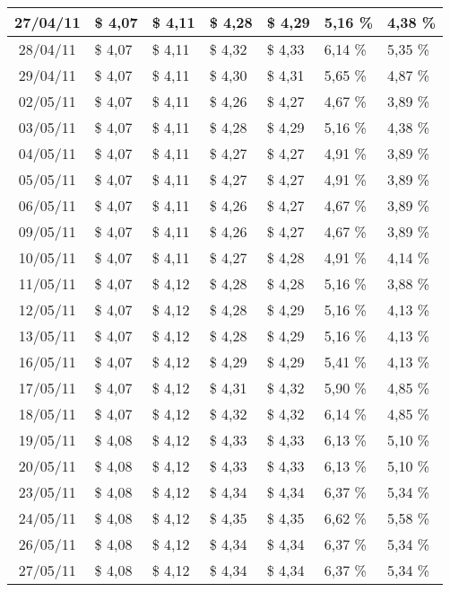 \begin{center}
\begin{longtable}{|c|p{1.5cm}|p{1.5cm}|p{1.5cm}|p{1.5cm}|p{1.5cm}|p{1.5cm}|}
27/04/11 & \$ 4,07 & \$ 4,11 & \$ 4,28 & \$ 4,29 & 5,16 \% & 4,38 \% \\ \hline
28/04/11 & \$ 4,07 & \$ 4,11 & \$ 4,32 & \$ 4,33 & 6,14 \% & 5,35 \% \\ \hline
29/04/11 & \$ 4,07 & \$ 4,11 & \$ 4,30 & \$ 4,31 & 5,65 \% & 4,87 \% \\ \hline
02/05/11 & \$ 4,07 & \$ 4,11 & \$ 4,26 & \$ 4,27 & 4,67 \% & 3,89 \% \\ \hline
03/05/11 & \$ 4,07 & \$ 4,11 & \$ 4,28 & \$ 4,29 & 5,16 \% & 4,38 \% \\ \hline
04/05/11 & \$ 4,07 & \$ 4,11 & \$ 4,27 & \$ 4,27 & 4,91 \% & 3,89 \% \\ \hline
05/05/11 & \$ 4,07 & \$ 4,11 & \$ 4,27 & \$ 4,27 & 4,91 \% & 3,89 \% \\ \hline
06/05/11 & \$ 4,07 & \$ 4,11 & \$ 4,26 & \$ 4,27 & 4,67 \% & 3,89 \% \\ \hline
09/05/11 & \$ 4,07 & \$ 4,11 & \$ 4,26 & \$ 4,27 & 4,67 \% & 3,89 \% \\ \hline
10/05/11 & \$ 4,07 & \$ 4,11 & \$ 4,27 & \$ 4,28 & 4,91 \% & 4,14 \% \\ \hline
11/05/11 & \$ 4,07 & \$ 4,12 & \$ 4,28 & \$ 4,28 & 5,16 \% & 3,88 \% \\ \hline
12/05/11 & \$ 4,07 & \$ 4,12 & \$ 4,28 & \$ 4,29 & 5,16 \% & 4,13 \% \\ \hline
13/05/11 & \$ 4,07 & \$ 4,12 & \$ 4,28 & \$ 4,29 & 5,16 \% & 4,13 \% \\ \hline
16/05/11 & \$ 4,07 & \$ 4,12 & \$ 4,29 & \$ 4,29 & 5,41 \% & 4,13 \% \\ \hline
17/05/11 & \$ 4,07 & \$ 4,12 & \$ 4,31 & \$ 4,32 & 5,90 \% & 4,85 \% \\ \hline
18/05/11 & \$ 4,07 & \$ 4,12 & \$ 4,32 & \$ 4,32 & 6,14 \% & 4,85 \% \\ \hline
19/05/11 & \$ 4,08 & \$ 4,12 & \$ 4,33 & \$ 4,33 & 6,13 \% & 5,10 \% \\ \hline
20/05/11 & \$ 4,08 & \$ 4,12 & \$ 4,33 & \$ 4,33 & 6,13 \% & 5,10 \% \\ \hline
23/05/11 & \$ 4,08 & \$ 4,12 & \$ 4,34 & \$ 4,34 & 6,37 \% & 5,34 \% \\ \hline
24/05/11 & \$ 4,08 & \$ 4,12 & \$ 4,35 & \$ 4,35 & 6,62 \% & 5,58 \% \\ \hline
26/05/11 & \$ 4,08 & \$ 4,12 & \$ 4,34 & \$ 4,34 & 6,37 \% & 5,34 \% \\ \hline
27/05/11 & \$ 4,08 & \$ 4,12 & \$ 4,34 & \$ 4,34 & 6,37 \% & 5,34 \% \\ \hline

\end{longtable}
\end{center}
